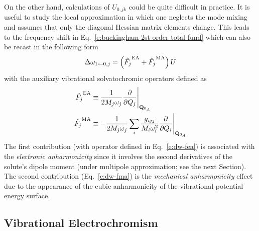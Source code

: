 \documentclass[a4paper,titlepage,twoside,fleqn,12pt]{book}
\begin{document}
\begin{refsection}
On the other hand, calculations of $U_{0,jk}$ could be quite difficult 
in practice. It is useful to study the local approximation in which
one neglects the mode mixing and assumes that only the diagonal Hessian
matrix elements change. This leads to the frequency shift in Eq.~\eqref{e:buckingham-2st-order-total-fund}
which can also be recast in the following form
%
\begin{equation} 
 \Delta\omega_{1\leftarrow 0,j} = \left( \hat{F_j}^{\rm EA} + \hat{F_j}^{\rm MA}\right) U
\end{equation}
%
with the auxiliary vibrational solvatochromic operators defined as
%
\begin{subequations} \label{e:dw-fea-fma}
 \begin{align}
  \hat{F_j}^{\rm EA} &\equiv  \frac{1}{2M_j\omega_j} \frac{\partial}{\partial Q_j} \Bigg|_{{\bf Q}_{0_A}} 
         \label{e:dw-fea}\\
  \hat{F_j}^{\rm MA} &\equiv -\frac{1}{2M_j\omega_j} 
             \sum_i \frac{g_{ijj}}{M_i\omega_i^2} \frac{\partial}{\partial Q_i} \Bigg|_{{\bf Q}_{0_A}} 
         \label{e:dw-fma}
 \end{align}
\end{subequations}
%
The first contribution (with operator defined in Eq.~\eqref{e:dw-fea}) 
is associated with the \emph{electronic anharmonicity}
since it involves the second derivatives of the solute's dipole
moment (under multipole approximation; see the next Section). 
The second contribution (Eq.~\eqref{e:dw-fma})
is the \emph{mechanical anharmonicity} effect due to the appearance of the 
cubic anharmonicity of the vibrational potential energy surface.

\subsection{Vibrational Electrochromism}


\end{refsection}
\end{document}
